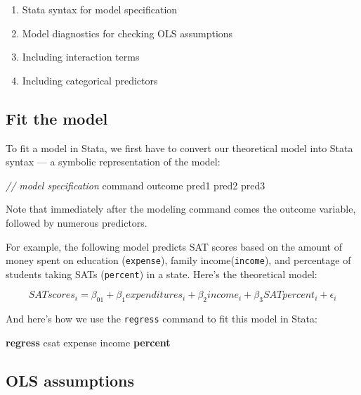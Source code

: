 \documentclass[
]{book}
\newenvironment{Shaded}{\begin{snugshade}}{\end{snugshade}}
\newcommand{\CommentTok}[1]{\textcolor[rgb]{0.56,0.35,0.01}{\textit{#1}}}
\newcommand{\KeywordTok}[1]{\textcolor[rgb]{0.13,0.29,0.53}{\textbf{#1}}}
\newcommand{\NormalTok}[1]{#1}
\providecommand{\tightlist}{%
  \setlength{\itemsep}{0pt}\setlength{\parskip}{0pt}}
\begin{document}
\begin{enumerate}
\def\labelenumi{\arabic{enumi}.}
\tightlist
\item
  Stata syntax for model specification
\item
  Model diagnostics for checking OLS assumptions
\item
  Including interaction terms
\item
  Including categorical predictors
\end{enumerate}

\hypertarget{fit-the-model}{%
\subsection{Fit the model}\label{fit-the-model}}

To fit a model in Stata, we first have to convert our theoretical model into
Stata syntax --- a symbolic representation of the model:

\begin{Shaded}
\begin{Highlighting}[]
\CommentTok{// model specification}
\NormalTok{command outcome pred1 pred2 pred3}
\end{Highlighting}
\end{Shaded}

Note that immediately after the modeling command comes the outcome variable, followed by numerous predictors.

For example, the following model predicts SAT scores based on the amount of money spent on education (\texttt{expense}), family income(\texttt{income}), and percentage of students taking SATs (\texttt{percent}) in a state. Here's the theoretical model:

\[
SATscores_i = \beta_01 + \beta_1expenditures_i + \beta_2income_i +\beta_3SATpercent_i + \epsilon_i
\]

And here's how we use the \texttt{regress} command to fit this model in Stata:

\begin{Shaded}
\begin{Highlighting}[]
\KeywordTok{regress}\NormalTok{ csat expense income }\KeywordTok{percent} 
\end{Highlighting}
\end{Shaded}

\hypertarget{ols-assumptions}{%
\subsection{OLS assumptions}\label{ols-assumptions}}
\end{document}
